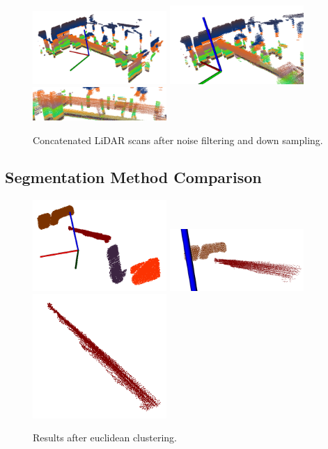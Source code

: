 \documentclass[12pt]{drexelthesis}
\let\Oldsubsection\subsection
\renewcommand{\subsection}{\FloatBarrier\Oldsubsection}
\begin{document}
\begin{figure}[!ht]
	\centering
		\includegraphics[width=2in]{images/real-lab-scans/filtered0.png}
		\includegraphics[width=2in]{images/real-lab-scans/filtered1.png}
		\includegraphics[width=2in]{images/real-lab-scans/filtered2.png}
		\caption[Concatenated LiDAR scans after noise filtering and down sampling]{\centering Concatenated LiDAR scans after noise filtering and down sampling.}
	\label{lidarresults:filtered}
\end{figure}

\subsection{Segmentation Method Comparison}

\begin{figure}[!ht]
	\centering
		\includegraphics[width=2in]{images/real-lab-scans/euclidean0.png}
		\includegraphics[width=2in]{images/real-lab-scans/euclidean1.png}
		\includegraphics[width=2in]{images/real-lab-scans/euclidean2.png}
		\caption[Euclidean clustering results on HDL-32E LiDAR scans]{\centering Results after euclidean clustering.}
	\label{lidarresults:euclidean}
\end{figure}
\end{document}
